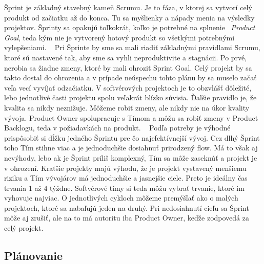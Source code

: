 \documentclass[10pt,slovak,a4paper]{article}
\begin{document}
Šprint je základný stavebný kameň Scrumu. Je to fáza, v ktorej sa vytvorí celý produkt od začiatku až do konca. Tu sa myšlienky a nápady menia na výsledky projektov. Šprinty sa opakujú toľkokrát, koľko je potrebné na splnenie ~\emph{Product Goal}, teda kým nie je vytvorený hotový produkt so všetkými potrebnými vylepšeniami. ~\cite{schwaber2020scrum}
Pri Šprinte by sme sa mali riadiť základnými pravidlami Scrumu, ktoré sú nastavené tak, aby sme sa vyhli neproduktivite a stagnácii. Po prvé, nerobia sa žiadne zmeny, ktoré by mali ohroziť Sprint Goal. Celý projekt by sa takto dostal do ohrozenia a v prípade neúspechu tohto plánu by sa muselo začať veľa vecí vyvíjať odzačiatku. V softvérových projektoch je to obzvlášť dôležité, lebo jednotlivé časti projektu spolu veľakrát blízko súvisia. Ďalšie pravidlo je, že kvalita sa nikdy neznižuje. Môžeme robiť zmeny, ale nikdy nie na úkor kvality vývoja. Product Owner spolupracuje s Tímom a môžu sa robiť zmeny v Product Backlogu, teda v požiadavkách na produkt. ~\cite{schwaber2020scrum}
Podľa potreby je výhodné prispôsobiť si dĺžku jedného Šprintu pre čo najefektívnejší vývoj. Cez dlhý Šprint toho Tím stihne viac a je jednoduchšie dosiahnuť prirodzený flow. Má to však aj nevýhody, lebo ak je Šprint príliš komplexný, Tím sa môže zaseknúť a projekt je v ohrození. Kratšie projekty majú výhodu, že je projekt vystavený menšiemu riziku a Tím vývojárov má jednoduchšie a jasnejšie ciele. Preto je ideálny čas trvania 1 až 4 týždne. Softvérové tímy si teda môžu vybrať trvanie, ktoré im vyhovuje najviac. O jednotlivých cykloch môžeme premýšľať ako o malých projektoch, ktoré sa nabaľujú jeden na druhý. Pri nedosiahnutí cieľu sa Šprint môže aj zrušiť, ale na to má autoritu iba Product Owner, keďže zodpovedá za celý projekt. ~\cite{schwaber2020scrum}


\subsection{Plánovanie}
\end{document}

